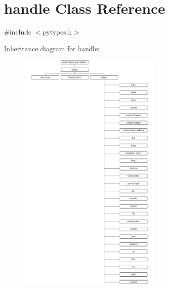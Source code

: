 \hypertarget{classhandle}{}\section{handle Class Reference}
\label{classhandle}


{\ttfamily \#include $<$pytypes.\+h$>$}

Inheritance diagram for handle\+:\begin{figure}[H]
\begin{center}
\leavevmode
\includegraphics[height=12.000000cm]{classhandle}
\end{center}
\end{figure}
